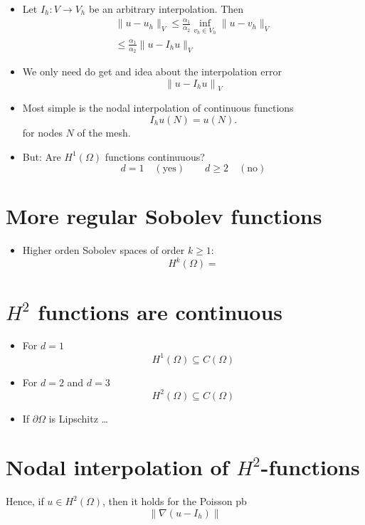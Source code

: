 \documentclass[openany,a4paper,11pt]{memoir}
\theoremstyle{definition}
\begin{document}
\begin{itemize}
\item Let $I_{h}\colon V\rightarrow V_{h}$ be an arbitrary interpolation. Then
  \begin{align*}
    \|u-u_h\|_{V}\le \frac{\alpha_1}{\alpha_2}\inf_{v_h\in V_h}\|u-v_h\|_{V}\\
    \le \frac{\alpha_1}{\alpha_2}\|u-I_hu\|_{V}
  \end{align*}
  
\item We only need do get and idea about the interpolation error \[ {\|u-I_hu\|}_{V}\]
  
\item Most simple is the nodal interpolation of continuous functions \[ I_hu(N)=u(N). \] for nodes $N$ of the mesh.
  
\item But: Are $H^1(\Omega)$ functions continuuous?
  \[d=1\quad (\text{yes})\qquad d\ge 2\quad(\text{no}) \]
\end{itemize}

\section{More regular Sobolev functions}
\begin{itemize}
\item Higher orden Sobolev spaces of order $k\ge 1$: \[ H^{k}(\Omega)= \]
\end{itemize}

\section{$H^2$ functions are continuous}
\begin{itemize}
\item For $d=1$ \[ H^1(\Omega)\subseteq C(\Omega) \]
  
\item For $d=2$ and $d=3$ \[ H^2(\Omega)\subseteq C(\Omega) \]
  
\item If $\partial\Omega$ is Lipschitz \ldots
\end{itemize}

\section{Nodal interpolation of $H^{2}$-functions}

Hence, if $u\in H^2(\Omega)$, then it holds for the Poisson pb \[\|\nabla (u-I_h)\| \]
\end{document}
